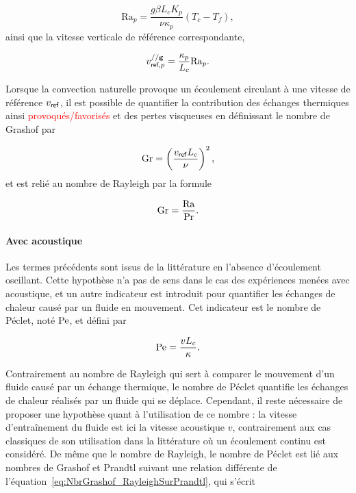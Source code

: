 \begin{equation}
	\mathrm{Ra}_p = \frac{g \beta L_c K_p}{\nu \kappa_p} (T_c-T_f),
	\label{eq:NbrRayleigh_poreux}
\end{equation}
ainsi que la vitesse verticale de référence correspondante, 

\begin{equation}
	v_{\textsf{ref},p}^{// \mathbf g} = \frac{\kappa_p}{L_c} \mathrm{Ra}_p.
	\label{eq:VitesseReference_Rayleigh_poreux}
\end{equation}


Lorsque la convection naturelle provoque un écoulement circulant à une vitesse de référence $v_{\sf ref}$, il est possible de quantifier la contribution des échanges thermiques ainsi \textcolor{red}{provoqués/favorisés} et des pertes visqueuses en définissant le nombre de Grashof par

\begin{equation}
	\mathrm{Gr} = \left( \frac{v_{\sf ref} L_c}{\nu} \right)^2,
	\label{eq:NbrGrashof}
\end{equation}
et est relié au nombre de Rayleigh par la formule

\begin{equation}
	\mathrm{Gr} = \frac{\mathrm{Ra}}{\mathrm{Pr}}.
	\label{eq:NbrGrashof_RayleighSurPrandtl}
\end{equation}


\paragraph{Avec acoustique}
Les termes précédents sont issus de la littérature en l'absence d'écoulement oscillant. Cette hypothèse n'a pas de sens dans le cas des expériences menées avec acoustique, et un autre indicateur est introduit pour quantifier les échanges de chaleur causé par un fluide en mouvement. Cet indicateur est le nombre de Péclet, noté $\mathrm{Pe}$, et défini par

\begin{equation}
	\mathrm{Pe} = \frac{v L_c}{\kappa}.
	\label{eq:NbrPeclet}
\end{equation}

Contrairement au nombre de Rayleigh qui sert à comparer le mouvement d'un fluide causé par un échange thermique, le nombre de Péclet quantifie les échanges de chaleur réalisés par un fluide qui se déplace. Cependant, il reste nécessaire de proposer une hypothèse quant à l'utilisation de ce nombre : la vitesse d'entraînement du fluide est ici la vitesse acoustique $v$, contrairement aux cas classiques de son utilisation dans la littérature où un écoulement continu est considéré. De même que le nombre de Rayleigh, le nombre de Péclet est lié aux nombres de Grashof et Prandtl suivant une relation différente de l'équation~\eqref{eq:NbrGrashof_RayleighSurPrandtl}, qui s'écrit

